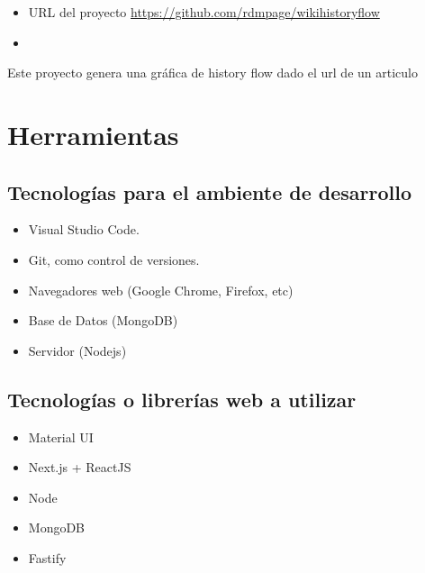 \begin{itemize}
    \item URL del proyecto \url{https://github.com/rdmpage/wikihistoryflow}
    \item
\end{itemize}

Este proyecto genera una gráfica de history flow dado el url de un articulo

\section{Herramientas}

\subsection{Tecnologías para el ambiente de desarrollo}
\begin{itemize}
    \item Visual Studio Code.
    \item Git, como control de versiones.
    \item Navegadores web (Google Chrome, Firefox, etc)
    \item Base de Datos (MongoDB)
    \item Servidor (Nodejs)
\end{itemize}

\subsection{Tecnologías o librerías web a utilizar}
\begin{itemize}
    \item Material UI
    \item Next.js + ReactJS
    \item Node
    \item MongoDB
    \item Fastify
\end{itemize}

